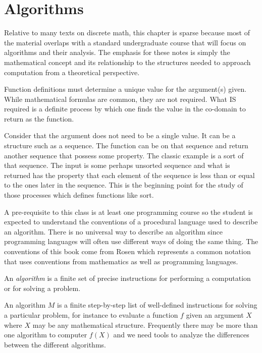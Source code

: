 \chapter {Algorithms}
Relative to many texts on discrete math, this chapter is sparse because most of the material overlaps with a standard undergraduate course that will focus on algorithms and their analysis. The emphasis for these notes is simply the mathematical concept and its relationship to the structures needed to approach computation from a theoretical perspective.

Function definitions must determine a unique value for the argument(s) given. While mathematical formulas are common, they are not required. What IS required is a definite process by which one finds the value in the co-domain to return as the function.

Consider that the argument does not need to be a single value. It can be a structure such as a sequence. The function can be on that sequence and return another sequence that possess some property. The classic example is a sort of that sequence. The input is some perhaps unsorted sequence and what is returned has the property that each element of the sequence is less than or equal to the ones later in the sequence. This is the beginning point for the study of those processes which defines functions like sort.

A pre-requisite to this class is at least one programming course so the student is expected to understand the conventions of a procedural language used to describe an algorithm. There is no universal way to describe an algorithm since programming languages will often use different ways of doing the same thing. The conventions of this book come from Rosen which represents a common notation that uses conventions from mathematics as well as programming languages.

\begin{definition}
An \textit{algorithm} is a finite set of precise instructions for performing a computation or for solving a problem.
\end{definition}
\begin{definition}
An algorithm $M$ is a finite step-by-step list of well-defined instructions for solving a particular problem, for instance to evaluate a function $f$ given an argument $X$ where $X$ may be any mathematical structure. Frequently there may be more than one algorithm to computer $f(X)$ and we need tools to analyze the differences between the different algorithms.
\end{definition}

